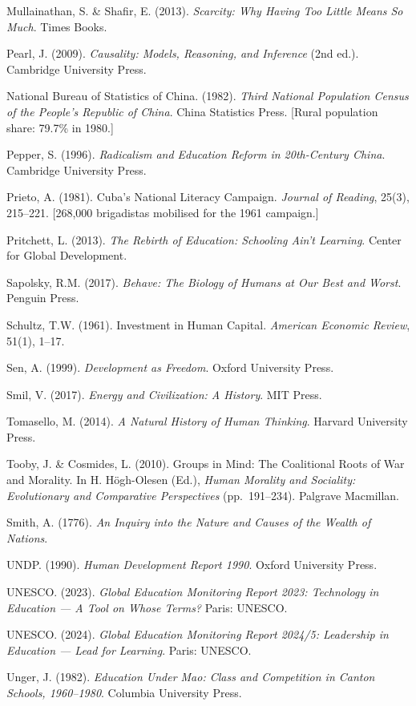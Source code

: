 \documentclass[12pt,letterpaper]{article}
\begin{document}
Mullainathan, S. \& Shafir, E. (2013). \emph{Scarcity: Why Having Too
Little Means So Much}. Times Books.

Pearl, J. (2009). \emph{Causality: Models, Reasoning, and Inference}
(2nd ed.). Cambridge University Press.

National Bureau of Statistics of China. (1982). \emph{Third National
Population Census of the People's Republic of China}. China Statistics
Press. {[}Rural population share: 79.7\% in 1980.{]}

Pepper, S. (1996). \emph{Radicalism and Education Reform in 20th-Century
China}. Cambridge University Press.

Prieto, A. (1981). Cuba's National Literacy Campaign. \emph{Journal of
Reading}, 25(3), 215--221. {[}268,000 brigadistas mobilised for the 1961
campaign.{]}

Pritchett, L. (2013). \emph{The Rebirth of Education: Schooling Ain't
Learning}. Center for Global Development.

Sapolsky, R.M. (2017). \emph{Behave: The Biology of Humans at Our
Best and Worst}. Penguin Press.

Schultz, T.W. (1961). Investment in Human Capital.
\emph{American Economic Review}, 51(1), 1--17.

Sen, A. (1999). \emph{Development as Freedom}. Oxford University Press.

Smil, V. (2017). \emph{Energy and Civilization: A History}. MIT Press.

Tomasello, M. (2014). \emph{A Natural History of Human Thinking}.
Harvard University Press.

Tooby, J. \& Cosmides, L. (2010). Groups in Mind: The Coalitional Roots
of War and Morality. In H. H\"{o}gh-Olesen (Ed.), \emph{Human Morality
and Sociality: Evolutionary and Comparative Perspectives} (pp.~191--234).
Palgrave Macmillan.

Smith, A. (1776). \emph{An Inquiry into the Nature and Causes of the
Wealth of Nations}.

UNDP. (1990). \emph{Human Development Report 1990}. Oxford University
Press.

UNESCO. (2023). \emph{Global Education Monitoring Report 2023:
Technology in Education --- A Tool on Whose Terms?} Paris: UNESCO.

UNESCO. (2024). \emph{Global Education Monitoring Report 2024/5:
Leadership in Education --- Lead for Learning}. Paris: UNESCO.

Unger, J. (1982). \emph{Education Under Mao: Class and Competition in
Canton Schools, 1960--1980}. Columbia University Press.
\end{document}
